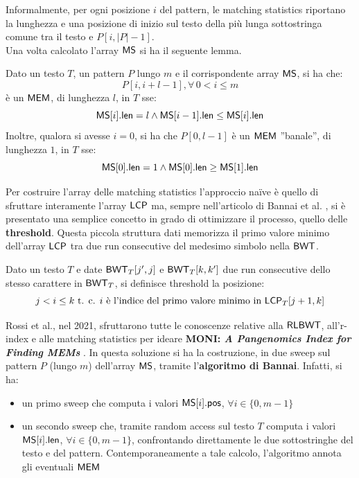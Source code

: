 \noindent
Informalmente, per ogni posizione $i$ del pattern, le
matching statistics riportano la lunghezza e 
una posizione di inizio sul testo della più lunga sottostringa comune tra il
testo e $P[i, |P|-1]$. \\
Una volta calcolato l'array $\mbox{\rm {\sf MS}}$ si ha il seguente lemma.
\begin{lemma}
  \label{lemma:mem}
  Dato un testo $T$, un pattern $P$ lungo $m$ e il
  corrispondente array $\mbox{\rm {\sf MS}}$, si ha che:
  \begin{equation}
    \label{eq:rlbwt5}
    P[i,i+l-1],\forall\, 0<i\leq m
  \end{equation}
  è un $\mbox{\rm {\sf MEM}}$, di lunghezza $l$, in $T$ sse:
  \begin{equation}
    \label{eq:rlbwt6}
    \mbox{\rm {\sf MS}}[i].\mbox{\rm {\sf len}}=l\land \mbox{\rm {\sf MS}}[i-1].\mbox{\rm {\sf len}}\leq \mbox{\rm {\sf MS}}[i].\mbox{\rm {\sf len}}
  \end{equation}
  Inoltre, qualora si avesse $i=0$, si ha che $P[0,l-1]$ è un $\mbox{\rm {\sf MEM}}$ 
  ''banale'', di lunghezza $1$, in $T$ sse:
  \begin{equation}
    \label{eq:rlbwt7}
    \mbox{\rm {\sf MS}}[0].\mbox{\rm {\sf len}}=1\land \mbox{\rm {\sf MS}}[0].\mbox{\rm {\sf len}}\geq \mbox{\rm {\sf MS}}[1].\mbox{\rm {\sf len}}
  \end{equation}
\end{lemma}
Per costruire l'array delle matching statistics l'approccio na\"{i}ve è quello di
sfruttare 
interamente l'array $\mbox{\rm {\sf LCP}}$ ma, sempre nell'articolo di Bannai et
al. \cite{bannai}, si è presentato una semplice concetto in grado di
ottimizzare il processo, quello delle \textbf{threshold}. Questa piccola
struttura dati memorizza il primo valore minimo dell'array $\mbox{\rm {\sf LCP}}$  tra due run
consecutive del medesimo simbolo nella $\mbox{\rm {\sf BWT}}$.
\begin{definizione}
  Dato un testo $T$ e date $\mbox{\rm {\sf BWT}}_T[j',j]$ e $\mbox{\rm {\sf BWT}}_T[k,k']$ due run consecutive
  dello stesso carattere in $\mbox{\rm {\sf BWT}}_T$, si definisce threshold la
  posizione:
  \begin{equation}
    \label{eq:rlbwt8}
    j< i \leq k\mbox{ t. c. } i\mbox{ è l'indice del primo valore minimo in
    }\mbox{\rm {\sf LCP}}_T[j+1,k] 
  \end{equation}
\end{definizione}
Rossi et al., nel 2021, sfruttarono tutte le conoscenze relative
alla $\mbox{\rm {\sf RLBWT}}$, all'r-index e alle matching statistics
per ideare \textbf{MONI:\textit{ A Pangenomics Index for Finding MEMs}}
\cite{moni}. In questa soluzione si ha la costruzione, in due
sweep sul pattern $P$ (lungo $m$)
dell'array $\mbox{\rm {\sf MS}}$, tramite l'\textbf{algoritmo di Bannai}. Infatti, si ha: 
\begin{itemize}
  \item un primo sweep che computa i valori $\mbox{\rm {\sf MS}}[i].\mbox{\rm {\sf pos}}$,
  $\forall i\in\{0,m-1\}$
  \item un secondo sweep che, tramite random access sul testo $T$ computa i
  valori $\mbox{\rm {\sf MS}}[i].\mbox{\rm {\sf len}}$, $\forall i\in\{0,m-1\}$, confrontando direttamente 
  le due sottostringhe del testo e
  del pattern. Contemporaneamente a tale calcolo, l'algoritmo annota gli
  eventuali $\mbox{\rm {\sf MEM}}$
\end{itemize}
